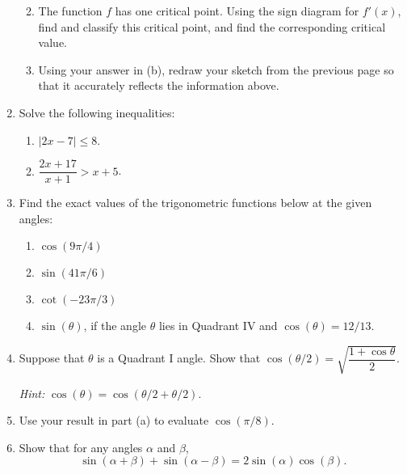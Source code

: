 \documentclass[12pt]{article}
\newcommand{\points}[1]{\marginpar{\hspace{24pt}[#1]}}
\begin{document}
\begin{enumerate}
\begin{enumerate}
\vspace{2in}

 \item The function $f$ has one critical point. Using the sign diagram for $f'(x)$, find and classify this critical point, and find the corresponding critical value. \points{2}

\vspace{2in}

 \item Using your answer in (b), redraw your sketch from the previous page so that it accurately reflects the information above.\points{3}
\end{enumerate}
\newpage

\item Solve the following inequalities:
\begin{enumerate}
 \item $\lvert 2x-7\rvert \leq 8$. \points{3}

\vspace{3in}

 \item $\dfrac{2x+17}{x+1}>x+5$. \points{5}
\end{enumerate}
\newpage

\item Find the exact values of the trigonometric functions below at the given angles:
\begin{enumerate}
 \item $\cos (9\pi/4)$ \points{2}

\vspace{1.5in}

 \item $\sin (41\pi/6)$ \points{2}

\vspace{1.5in}

 \item $\cot (-23\pi/3)$ \points{3}

\vspace{2.5in}

 \item $\sin(\theta)$, if the angle $\theta$ lies in Quadrant IV and $\cos(\theta) = 12/13$. \points{3}
\end{enumerate}
\newpage

\item Suppose that $\theta$ is a Quadrant I angle. Show that $\cos(\theta/2) = \sqrt{\dfrac{1+\cos \theta}{2}}$. \points{4}

{\em Hint:} $\cos(\theta) = \cos(\theta/2+\theta/2)$.

\vspace{3in}

\item Use your result in part (a) to evaluate $\cos (\pi/8)$. \points{2}

\vspace{1.5in}

\item Show that for any angles $\alpha$ and $\beta$, \points{4}
\[
 \sin(\alpha+\beta)+\sin(\alpha-\beta) = 2\sin(\alpha)\cos(\beta).
\]



\end{enumerate}
\newpage
\end{document}
